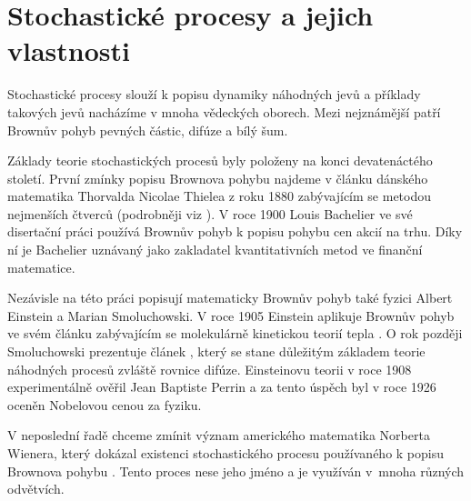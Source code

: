 \documentclass[a4paper,12pt]{report}
\theoremstyle{definition} \newtheorem{definice}[veta]{Definice}
\theoremstyle{remark}
\begin{document}
\section{Stochastické procesy a jejich vlastnosti}
Stochastické procesy slouží k popisu dynamiky náhodných jevů a příklady takových jevů nacházíme v mnoha vědeckých oborech.
Mezi nejznámější patří Brownův pohyb pevných částic, difúze a bílý šum.

Základy teorie stochastických procesů byly položeny na konci devatenáctého století.
První zmínky popisu Brownova pohybu najdeme v článku dánského matematika Thorvalda Nicolae Thielea z roku 1880 zabývajícím se metodou nejmenších čtverců (podrobněji viz \cite{lauritzen2002thiele}). %
V roce 1900 Louis Bachelier ve své disertační práci \cite{bachelier} používá Brownův pohyb k popisu pohybu cen akcií na trhu.
Díky ní je Bachelier uznávaný jako zakladatel kvantitativních metod ve finanční matematice.

Nezávisle na této práci popisují matematicky Brownův pohyb také fyzici Albert Einstein a Marian Smoluchowski. 
V roce 1905 Einstein aplikuje Brownův pohyb ve svém článku zabývajícím se molekulárně kinetickou teorií tepla \cite{einstein}.
O rok později Smoluchowski prezentuje článek \cite{Smoluchowski}, který se stane důležitým základem teorie náhodných procesů zvláště rovnice difúze.
Einsteinovu teorii v roce 1908 experimentálně ověřil Jean Baptiste Perrin \cite{perrin2013brownian} a za tento úspěch byl v roce 1926 oceněn Nobelovou cenou za fyziku. 

V neposlední řadě chceme zmínit význam amerického matematika Norberta Wienera, který dokázal existenci stochastického procesu používaného k popisu Brownova pohybu \cite{wiener1923differential}. 
Tento proces nese jeho jméno a je využíván v~mnoha různých odvětvích.
\end{document}
